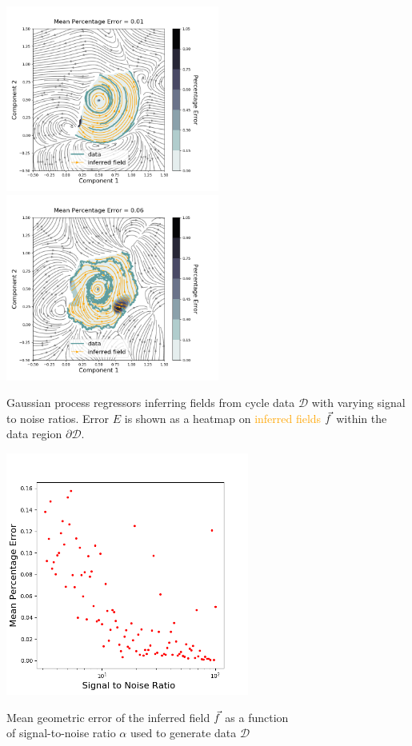 \begin{Figure}
\includegraphics[width=70mm]{figures/cycle-2.png}
\includegraphics[width=70mm]{figures/cycle-1.png}
\caption{Gaussian process regressors inferring fields from \textcolor{Emerald}{cycle data} $\mathcal{D}$ with varying signal to noise ratios. Error $E$ is shown as a heatmap on \textcolor{orange}{inferred fields}  $\vec{f}$ 
within the data region $\partial\mathcal{D}$.}
\label{fig:inferred-cycles}
\end{Figure}
\vspace{-2em}
\begin{Figure}
\includegraphics[width=80mm]{figures/cycle-snr.png}
\caption{Mean geometric error of the inferred field $\vec{f}$ as a function\\
of signal-to-noise ratio $\alpha$ used to generate data $\mathcal{D}$}
\label{fig:inferred-at-snr}
\end{Figure}

